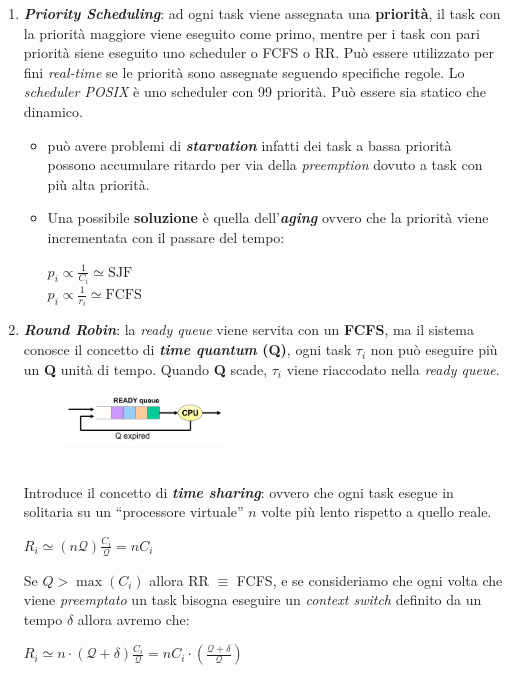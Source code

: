 \begin{enumerate}
    \item \textbf{\textit{Priority Scheduling}}: ad ogni task viene assegnata una \textbf{priorità}, il task con la priorità maggiore viene eseguito come primo, mentre per i task con pari priorità siene eseguito uno scheduler o FCFS o RR. Può essere utilizzato per fini \textit{real-time} se le priorità sono assegnate seguendo specifiche regole. Lo \textit{scheduler POSIX} è uno scheduler con 99 priorità. Può essere sia statico che dinamico.
    \begin{itemize}
        \item può avere problemi di \textbf{\textit{starvation}} infatti dei task a bassa priorità possono accumulare ritardo per via della \textit{preemption} dovuto a task con più alta priorità.
        \item Una possibile \textbf{soluzione} è quella dell'\textbf{\textit{aging}} ovvero che la priorità viene incrementata con il passare del tempo: \\
        \begin{center}
            $p_i \propto \frac{1}{C_i} \simeq \text{SJF}$ \\ 
            $p_i \propto \frac{1}{r_i} \simeq \text{FCFS}$
        \end{center}
    \end{itemize} 

    \item \textbf{\textit{Round Robin}}: la \textit{ready queue} viene servita con un \textbf{FCFS}, ma il sistema conosce il concetto di \textbf{\textit{time quantum} (Q)}, ogni task $\tau_i$ non può eseguire più un \textbf{Q} unità di tempo. Quando \textbf{Q} scade, $\tau_i$ viene riaccodato nella \textit{ready queue}.
    \begin{figure}[h]
        \centering
        \includegraphics[width=0.4\textwidth]{img/rr}
    \end{figure}
    \\
    Introduce il concetto di \textbf{\textit{time sharing}}: ovvero che ogni task esegue in solitaria su un ``processore virtuale'' $n$ volte più lento rispetto a quello reale.
    \begin{center}
        $R_i \simeq (n\mathcal{Q}) \frac{C_i}{\mathcal{Q}} = nC_i$
    \end{center}
    Se $Q > \max(C_i)$ allora RR $\equiv$ FCFS, e se consideriamo che ogni volta che viene \textit{preemptato} un task bisogna eseguire un \textit{context switch} definito da un tempo $\delta$ allora avremo che:
    \begin{center}
        $R_i \simeq n \cdot (\mathcal{Q} + \delta) \frac{C_i}{\mathcal{Q}} = nC_i \cdot (\frac{\mathcal{Q} + \delta}{\mathcal{Q}})$
    \end{center}


\end{enumerate}
